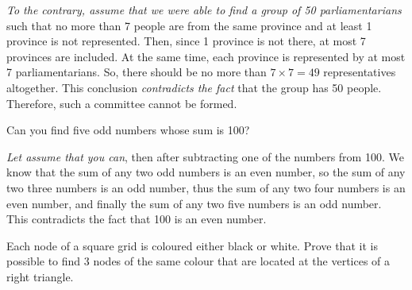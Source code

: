 \documentclass{article}
\begin{document}
\begin{soln}
    \textit{To the contrary, assume that we were able to find a group of 50 parliamentarians} such that
    no more than 7 people are from the same province and at least 1 province is not represented.
    Then, since 1 province is not there, at most 7 provinces are included.
    At the same time, each province is represented by at most 7 parliamentarians.
    So, there should be no more than $7 \times 7 = 49$ representatives altogether.
    This conclusion \textit{contradicts the fact} that the group has 50 people.
    Therefore, such a committee cannot be formed.
\end{soln}

\newpage

\begin{example*}[Example 3]
    Can you find five odd numbers whose sum is 100?
\end{example*}

\begin{soln}
    \textit{Let assume that you can}, then after subtracting one of the numbers from 100.
    We know that the sum of any two odd numbers is an even number,
    so the sum of any two three numbers is an odd number,
    thus the sum of any two four numbers is an even number,
    and finally the sum of any two five numbers is an odd number.
    This contradicts the fact that 100 is an even number.
\end{soln}

\begin{example*}[Example 4]
    Each node of a square grid is coloured either black or white.
    Prove that it is possible to find 3 nodes of the same colour that are located at the vertices of a right triangle.
\end{example*}
\end{document}
